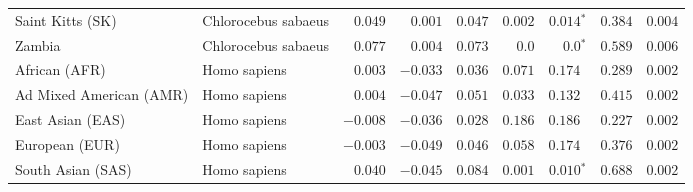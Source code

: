 \begin{center}
\begin{adjustbox}{width = 1\textwidth}
\begin{tabular}{|l|l|r|r|r|r|r|r|r|}
            Saint Kitts (SK)                  & Chlorocebus sabaeus        & $ 0.049$ & $ 0.001$ & $ 0.047$ & $ 0.002$ & $\bm{ 0.014{^*}}$        & $ 0.384$ & $ 0.004$ \\
            Zambia        & Chlorocebus sabaeus        & $ 0.077$ & $ 0.004$ & $ 0.073$ & $0.0$ & $\bm{0.0{^*}}$ & $ 0.589$ & $ 0.006$ \\
            African (AFR)               & Homo sapiens        & $ 0.003$ & $-0.033$ & $ 0.036$ & $ 0.071$ & $ 0.174~~$        & $ 0.289$ & $ 0.002$ \\
            Ad Mixed American (AMR)                 & Homo sapiens        & $ 0.004$ & $-0.047$ & $ 0.051$ & $ 0.033$ & $ 0.132~~$        & $ 0.415$ & $ 0.002$ \\
            East Asian (EAS)              & Homo sapiens        & $-0.008$ & $-0.036$ & $ 0.028$ & $ 0.186$ & $ 0.186~~$ & $ 0.227$ & $ 0.002$ \\
            European (EUR)              & Homo sapiens        & $-0.003$ & $-0.049$ & $ 0.046$ & $ 0.058$ & $ 0.174~~$ & $ 0.376$ & $ 0.002$ \\
            South Asian (SAS)              & Homo sapiens        & $ 0.040$ & $-0.045$ & $ 0.084$ & $ 0.001$ & $\bm{ 0.010{^*}}$ & $ 0.688$ & $ 0.002$ \\
            \bottomrule
        \end{tabular}
    \end{adjustbox}
    \newpage
\end{center}

